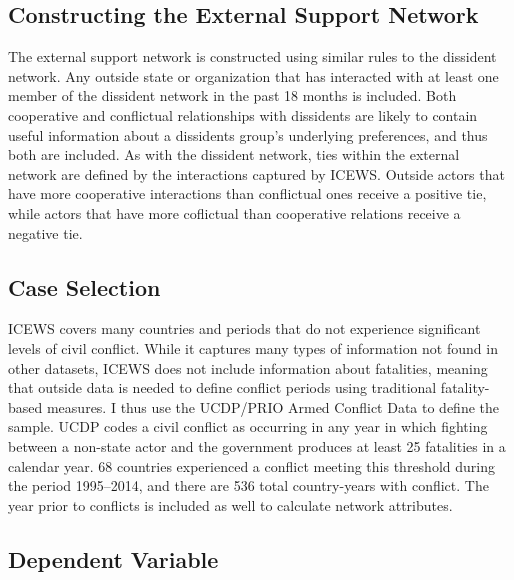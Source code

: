 \subsection{Constructing the External Support Network}

The external support network is constructed using similar rules to the dissident network. Any outside state or organization that has interacted with at least one member of the dissident network in the past 18 months is included. Both cooperative and conflictual relationships with dissidents are likely to contain useful information about a dissidents group's underlying preferences, and thus both are included. As with the dissident network, ties within the external network are defined by the interactions captured by ICEWS. Outside actors that have more cooperative interactions than conflictual ones receive a positive tie, while actors that have more coflictual than cooperative relations receive a negative tie.

\subsection{Case Selection}

ICEWS covers many countries and periods that do not experience significant levels of civil conflict. While it captures many types of information not found in other datasets, ICEWS does not include information about fatalities, meaning that outside data is needed to define conflict periods using traditional fatality-based measures. I thus use the UCDP/PRIO Armed Conflict Data \citep{Pettersson2015a} to define the sample. UCDP codes a civil conflict as occurring in any year in which fighting between a non-state actor and the government produces at least 25 fatalities in a calendar year. 68 countries experienced a conflict meeting this threshold during the period 1995--2014, and there are 536 total country-years with conflict. The year prior to conflicts is included as well to calculate network attributes.

\subsection{Dependent Variable}

